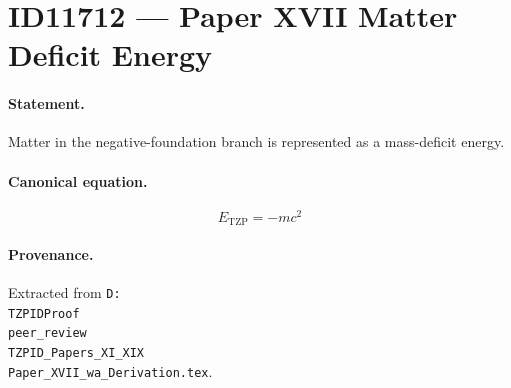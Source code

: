 \section*{ID11712 --- Paper XVII Matter Deficit Energy}

\paragraph{Statement.}
Matter in the negative-foundation branch is represented as a mass-deficit energy.

\paragraph{Canonical equation.}
\[
E_{\mathrm{TZP}}=-mc^2
\]

\paragraph{Provenance.}
Extracted from \texttt{D:\\TZPIDProof\\peer\_review\\TZPID\_Papers\_XI\_XIX\\Paper\_XVII\_wa\_Derivation.tex}.
